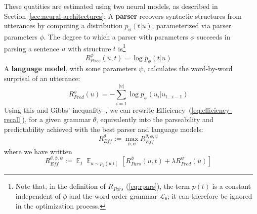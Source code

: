 \documentclass[10pt,twoside,lineno]{article}
\DeclareMathOperator*{\argmax}{arg\,max}
\DeclareMathOperator{\E}{\mathop{\mathbb{E}}}
\newcommand{\key}[1]{\textbf{#1}}
\newcommand{\utterance}{\mathcal{U}}
\newcommand{\tree}{\mathcal{T}}
\begin{document}
These quatities are estimated using two neural models, as described in Section~\ref{sec:neural-architectures}:
A \key{parser} recovers syntactic structures from utterances by computing a distribution $p_\phi(t|u)$, parameterized via parser parameters $\phi$.
The degree to which a parser with parameters $\phi$ succeeds in parsing a sentence $u$ with structure $t$ is\footnote{Note that, in the definition of $R_{Pars}$ (\ref{eq:rpars}), the term $p(t)$ is a constant independent of $\phi$ and the word order grammar $\mathcal{L}_\theta$; it can therefore be ignored in the optimization process.} 
\begin{equation}
	R_{Pars}^{\phi}(u,t) =  \log p_\phi(t|u)
\end{equation}
%
A \key{language model}, with some parameters $\psi$, calculates the word-by-word surprisal of an utterance:
\begin{equation}
	R_{Pred}^{\psi}(u) = - \sum_{i=1}^{|u|} \log p_\psi(u_i|u_{1\dots i-1})
\end{equation}
Using this and Gibbs' inequality~\cite{cover2006elements}, we can rewrite Efficiency~(\ref{eq:efficiency-recall}), for a given grammar $\theta$, equivalently into the parseability and predictability achieved with the best parser and language models:
\begin{equation}
	R_{\textit{Eff}}^{\theta} := \max_{\phi,\psi} R_{\textit{Eff}}^{\theta, \phi, \psi}
\end{equation}\label{eq:efficiency-rewrite}
where we have written
\begin{equation}
R_{\textit{Eff}}^{\theta, \phi, \psi} := \E_t \E_{u \sim p_\theta(u|t)} \left[R_{Pars}^{\phi}(u,t) + \lambda R_{Pred}^{\psi}(u)\right]
\end{equation}
%
\end{document}
